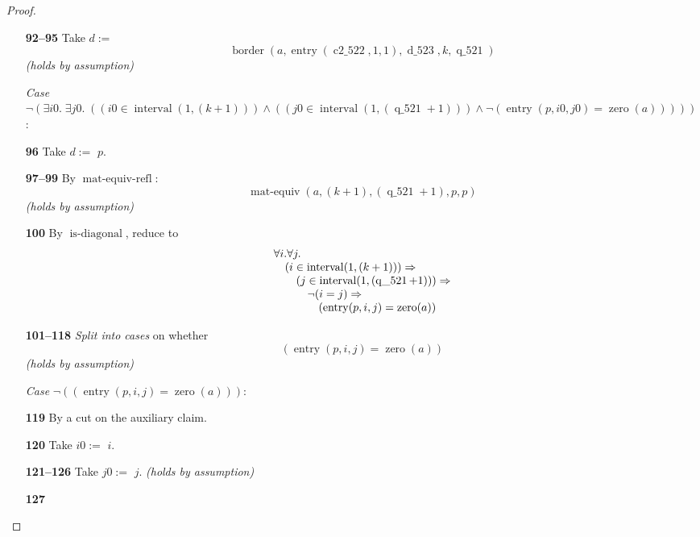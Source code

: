 \documentclass[11pt]{article}
\theoremstyle{plain}
\begin{document}
\begin{proof}
\begin{itemize}[leftmargin=2.8em, itemsep=4pt, parsep=1pt]
  \item[\textbf{92--95}] Take $d :=$
\begin{equation*}
\operatorname{border}(a, \operatorname{entry}(\operatorname{c2\_522}, 1, 1), \operatorname{d\_523}, k, \operatorname{q\_521})
\end{equation*}
  \emph{(holds by assumption)}
  \item[]\emph{Case} $\lnot(\exists \mathit{i0}.\; \exists \mathit{j0}.\; ((\mathit{i0} \in \operatorname{interval}(1, (k + 1))) \wedge ((\mathit{j0} \in \operatorname{interval}(1, (\operatorname{q\_521} + 1))) \wedge \neg (\operatorname{entry}(p, \mathit{i0}, \mathit{j0}) = \operatorname{zero}(a)))))$:
  \item[\textbf{96}] Take $d :=$ $p$.
  \item[\textbf{97--99}] By $\operatorname{mat\text{-}equiv\text{-}refl}$:
\begin{equation*}
\operatorname{mat\text{-}equiv}(a, (k + 1), (\operatorname{q\_521} + 1), p, p)
\end{equation*}
  \emph{(holds by assumption)}
  \item[\textbf{100}] By $\operatorname{is\text{-}diagonal}$, reduce to
\begin{equation*}
\begin{array}{@{}l@{}} \forall i. \forall j. \\ \quad (i \in \operatorname{interval}(1, (k + 1))) \Rightarrow  \\ \quad \quad (j \in \operatorname{interval}(1, (\operatorname{q\_521} + 1))) \Rightarrow  \\ \quad \quad \quad \neg (i = j) \Rightarrow  \\ \quad \quad \quad \quad (\operatorname{entry}(p, i, j) = \operatorname{zero}(a)) \end{array}
\end{equation*}

  \item[\textbf{101--118}] \emph{Split into cases} on whether
\begin{equation*}
(\operatorname{entry}(p, i, j) = \operatorname{zero}(a))
\end{equation*}
  \emph{(holds by assumption)}
  \item[]\emph{Case} $\lnot((\operatorname{entry}(p, i, j) = \operatorname{zero}(a)))$:
  \item[\textbf{119}] By a cut on the auxiliary claim.
  \item[\textbf{120}] Take $\mathit{i0} :=$ $i$.
  \item[\textbf{121--126}] Take $\mathit{j0} :=$ $j$.  \emph{(holds by assumption)}
  \item[\textbf{127}] 
\end{itemize}
\end{proof}
\end{document}

